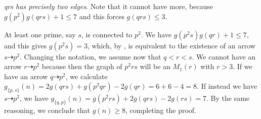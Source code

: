\documentclass{article}
\newcommand{\hthref}[1]{\hyperref[#1]{\thref{#1}}}
\theoremstyle{plain}
\theoremstyle{definition}
\begin{document}
 \emph{qrs has precisely two edges}. Note that it cannot have more, because $g(p^2)g(qrs) + 1 \le 7$ and this forces $g(qrs) \le 3$.

At least one prime, say $s$, is connected to $p^2$. We have $g(p^2 s)g(qr) + 1 \le 7$, and this gives $g(p^2 s) = 3$, which, by \hthref{euppq}, is equivalent to the existence of an arrow $s \dashrightarrow p^2$. Changing the notation, we assume now that $q < r < s$. We cannot have an arrow $r \dashrightarrow p^2$ because then the graph of $p^2 r s$ will be an $M_1(r)$ with $r > 3$. If we have an arrow $q \dashrightarrow p^2$, we calculate $g_{\{p, s\}}(n) = 2g(qrs) + g(p^2 q r) - 2g(qr) = 6 + 6 - 4 = 8.$ If instead we have $s \dashrightarrow p^2$, we have $g_{\{q, p\}}(n) = g(p^2 r s) + 2g(qrs) - 2g(rs) = 7$. By the same reasoning, we conclude that $g(n) \ge 8$, completing the proof.
\end{document}
